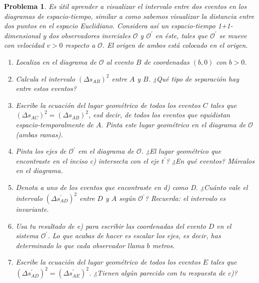 \documentclass[12pt]{article}
\theoremstyle{break}
\newtheorem{exercise}{Problema}
\theoremstyle{nonumberbreak}
\newcommand*{\observer}{\mathcal{O}}
\newcommand*{\primeobserver}{\mathcal{O}^{\prime}}
\begin{document}
    \begin{exercise}
        Es útil aprender a visualizar el intervalo entre dos eventos en los diagramas de espacio-tiempo, similar a como sabemos visualizar la distancia entre dos puntos en el espacio Euclidiano. Considera así un espacio-tiempo 1+1-dimensional y dos observadores inerciales \(\observer\) y \(\primeobserver\) en éste, tales que \(\primeobserver\) se mueve con velocidad \(v > 0\) respecto a \(\observer\). El origen de ambos está colocado en el origen.

        \begin{enumerate}[label = \alph*)]
            \item Localiza en el diagrama de \(\observer\) al evento \(B\) de coordenadas \((b, 0)\) con \(b > 0\).
            \item Calcula el intervalo \((\Delta s_{AB})^{2}\) entre \(A\) y \(B\). ¿Qué tipo de separación hay entre estos eventos?
            \item Escribe la ecuación del lugar geométrico de todos los eventos \(C\) tales que \((\Delta s_{AC})^{2} = (\Delta s_{AB})^{2}\), esd decir, de todos los eventos que equidistan espacio-temporalmente de \(A\). Pinta este lugar geométrico en el diagrama de \(\observer\) (ambas ramas).
            \item Pinta los ejes de \(\primeobserver\) em el diagrama de \(\observer\). ¿El lugar geométrico que encontraste en el inciso c) intersecta con el eje \(t^{\prime}\)? ¿En qué eventos? Márcalos en el diagrama.
            \item Denota a uno de los eventos que encontraste en d) como D. ¿Cuánto vale el intervalo \((\Delta s^{\prime}_{AD})^{2}\) entre \(D\) y \(A\) según \(\primeobserver\)? Recuerda: el intervalo es invariante.
            \item Usa tu resultado de e) para escribir las coordenadas del evento \(D\) en el sistema \(\primeobserver\). Lo que acabas de hacer es escalar los ejes, es decir, has determinado lo que cada observador llama \(b\) metros.
            \item Escribe la ecuación del lugar geométrico de todos los eventos \(E\) tales que \((\Delta s^{\prime}_{AD})^{2} = (\Delta s^{\prime}_{AE})^{2}\). ¿Tienen algún parecido con tu respuesta de c)?
        \end{enumerate}
    \end{exercise}
\end{document}
